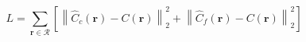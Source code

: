 \begin{equation}
    L = \sum_{\pmb{r} \in \mathcal{R}} \left[\left\| \hat{C}_c(\pmb{r}) - C(\pmb{r}) \right\|^2_2 + \left\| \hat{C}_f(\pmb{r}) - C(\pmb{r}) \right\|^2_2\right]
    \label{eq:nerf-loss}
\end{equation}